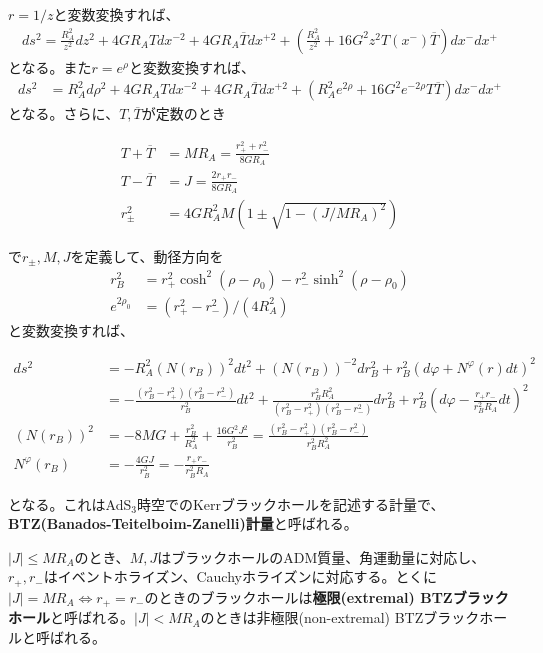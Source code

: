 $r=1/z$と変数変換すれば、
\begin{align}\label{FeffermangrahamZ}
ds^2=\frac{R_A ^2}{z^2}dz^2+4GR_A Tdx^{-2}+4GR_A \overline{T}dx^{+2}+\left(\frac{R_A^2}{z^2}+16G^2 z^2 T(x^-)\overline{T}\right)dx^-dx^+
\end{align}
となる。また$r=e^\rho$と変数変換すれば、
\begin{align}\label{FeffermangrahamRHO}
ds^2&=R_A^2 d\rho^2+4GR_A Tdx^{-2}+4GR_A \overline{T}dx^{+2}+\left(R_A^2 e^{2\rho}+16G^2 e^{-2\rho}T\overline{T}\right)dx^-dx^+
\end{align}
となる。さらに、$T,\overline{T}$が定数のとき
\begin{oframed}
\begin{align}
T+\overline{T}&=MR_A=\frac{r_+^2+r_-^2}{8GR_A}\\
T-\overline{T}&=J=\frac{2r_+r_-}{8GR_A}\\
r_\pm^2&=4GR_A^2M \left(1\pm\sqrt{1-(J/MR_A)^2}\right)
\end{align}
\end{oframed}
で$r_\pm,M,J$を定義して、動径方向を
\begin{align}
r_{B}^2&=r_+^2\cosh^2(\rho-\rho_0)-r_-^2\sinh^2(\rho-\rho_0)\\
e^{2\rho_0}&=(r_+^2-r_-^2)/(4R_A^2)
\end{align}
と変数変換すれば、
\begin{oframed}
\begin{align}\label{FeffermangrahamBTZ}
ds^2&=-R_A^2(N(r_{B}))^2dt^2+(N(r_{B}))^{-2}dr_{B}^2+r_{B}^2(d\varphi+N^\varphi(r)dt)^2\\
&=-\frac{(r_{B}^2-r_+^2)(r_{B}^2-r_-^2)}{r_{B}^2}dt^2+\frac{r_{B}^2R_A^2}{(r_{B}^2-r_+^2)(r_{B}^2-r_-^2)}dr_{B}^2+r_{B}^2\left(d\varphi-\frac{r_+r_-}{r_{B}^2R_A}dt\right)^2\\
(N(r_{B}))^2&=-8MG+\frac{r_{B}^2}{R_A^2}+\frac{16G^2J^2}{r_{B}^2}=\frac{(r_{B}^2-r_+^2)(r_{B}^2-r_-^2)}{r_{B}^2R_A^2}\\
N^\varphi(r_{B})&=-\frac{4GJ}{r_{B}^2}=-\frac{r_+r_-}{r_{B}^2R_A}
\end{align}
\end{oframed}
となる。これはAdS$_3$時空でのKerrブラックホールを記述する計量で、\textbf{BTZ(Banados-Teitelboim-Zanelli)計量}\cite{Banados:1992wn}と呼ばれる。

$|J|\leq MR_A$のとき、$M,J$はブラックホールのADM質量、角運動量に対応し、$r_+,r_-$はイベントホライズン、Cauchyホライズンに対応する。とくに$|J|=MR_A\iff r_+=r_-$のときのブラックホールは\textbf{極限(extremal) BTZブラックホール}と呼ばれる。$|J|< MR_A$のときは非極限(non-extremal) BTZブラックホールと呼ばれる。


